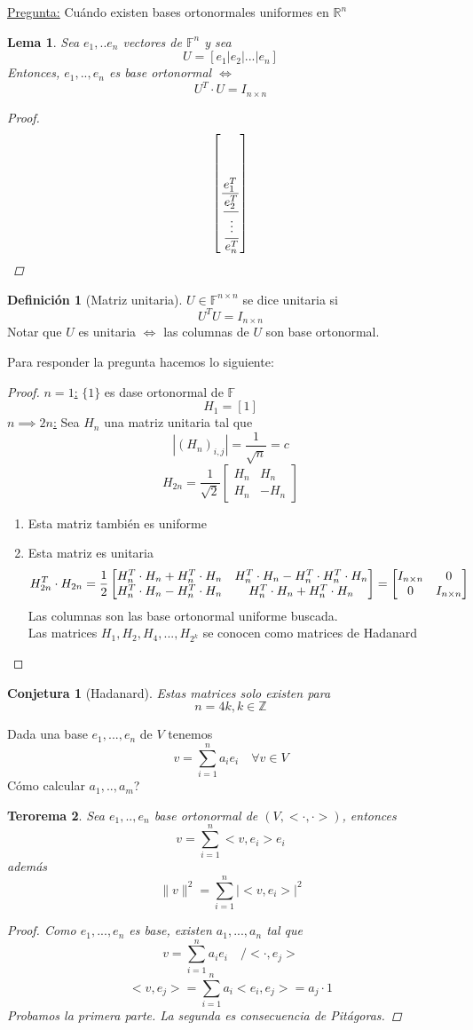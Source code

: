 \documentclass[11pt]{book}
\newcommand{\set}[1]{\mathbb{#1}}
\newtheorem{thm}{Terorema}[section]
\newtheorem{lem}[thm]{Lema}
\newtheorem*{conj}{Conjetura}
\theoremstyle{definition}
\newtheorem{defn}{Definición}[section]
\begin{document}
\underline{Pregunta:} Cuándo existen bases ortonormales uniformes en $\set{R}^n$
\begin{lem}
	Sea $e_1,..e_n$ vectores de $\set{F}^n$ y sea 
	\[U=\left[e_1|e_2|...|e_n\right]\]
	Entonces, $e_1,..,e_n$ es base ortonormal $\iff$
	\[U^T\cdot U=I_{n\times n}\]
	\begin{proof}
		\[\left[\frac{e_1^T}{\cfrac{e_2^T}{\cfrac{\vdots}{e_n^T}}}\right]\]
	\end{proof}
\end{lem}
\begin{defn}[Matriz unitaria]
	$U\in\set{F}^{n\times n}$ se dice unitaria si
	\[U^TU=I_{n\times n}\]
	Notar que $U$ es unitaria $\iff$ las columnas de $U$ son base ortonormal.
\end{defn}
Para responder la pregunta hacemos lo siguiente:
\begin{proof}
	\underline{$n=1$:} $\{1\}$ es dase ortonormal de $\set{F}$
	\[H_1=[1]\]
	\underline{$n\implies 2n$:} Sea $H_n$ una matriz unitaria tal que
	\[|(H_n)_{i,j}|=\frac{1}{\sqrt{n}}=c\]
	\[H_{2n}=\frac{1}{\sqrt{2}}\begin{bmatrix}
		H_n & H_n\\
		H_n & -H_n
	\end{bmatrix}\]
	\begin{enumerate}
		\item Esta matriz también es uniforme

		\item Esta matriz es unitaria
		\[H_{2n}^T\cdot H_{2n}=\frac{1}{2}\begin{bmatrix}
			H_n^T\cdot H_n+H_n^T\cdot H_n & H_n^T\cdot H_n-H_n^T\cdot H_n^T\cdot H_n\\
			H_n^T\cdot H_n-H_n^T\cdot H_n & H_n^T\cdot H_n+H_n^T\cdot H_n
		\end{bmatrix}=\begin{bmatrix}
			I_{n\times n} & 0\\
			0 & I_{n\times n}
		\end{bmatrix}\qedhere\]
		Las columnas son las base ortonormal uniforme buscada.\\
		Las matrices $H_1,H_2,H_4,...,H_{2^k}$ se conocen como matrices de Hadanard
	\end{enumerate}
\end{proof}
\begin{conj}[Hadanard]
	Estas matrices solo existen para
	\[n=4k,k\in\set{Z}\]
\end{conj}
Dada una base $e_1,...,e_n$ de $V$ tenemos
\[v=\sum^n_{i=1}a_ie_i\quad \forall v\in V\]
Cómo calcular $a_1,..,a_m$?
\begin{thm}
	Sea $e_1,..,e_n$ base ortonormal de $(V,<\cdot,\cdot>)$, entonces
	\[v=\sum^n_{i=1}<v,e_i>e_i\]
	además
	\[\|v\|^2=\sum^n_{i=1}|<v,e_i>|^2\]
	\begin{proof}
		Como $e_1,...,e_n$ es base, existen $a_1,...,a_n$ tal que\[v=\sum^n_{i=1}a_ie_i\quad /<\cdot,e_j>\]
		\[<v,e_j>=\sum^n_{i=1}a_i<e_i,e_j>=a_j\cdot 1\]
		Probamos la primera parte. La segunda es consecuencia de Pitágoras.
	\end{proof}
\end{thm}
\end{document}
